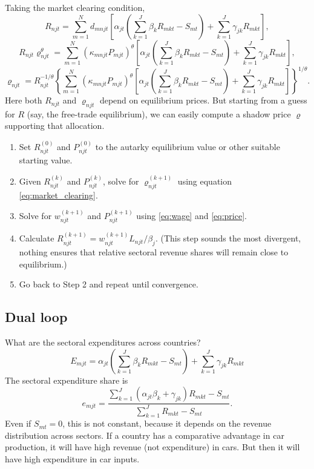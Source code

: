 \documentclass[12pt]{article}
\begin{document}
Taking the market clearing condition,
\begin{equation}
	R_{njt} = \sum_{m=1}^N
		d_{mnjt}
		\left[
			\alpha_{jt}
			\left(
				\sum_{k=1}^J\beta_k R_{mkt} - S_{mt}
			\right)
			+ \sum_{k=1}^J\gamma_{jk}R_{mkt}
		\right],
\end{equation}
\[
	R_{njt}\varrho_{njt}^{\theta} = \sum_{m=1}^N
		(\kappa_{mnjt} P_{mjt})^{\theta}
		\left[
			\alpha_{jt}
			\left(
				\sum_{k=1}^J\beta_k R_{mkt} - S_{mt}
			\right)
			+ \sum_{k=1}^J\gamma_{jk}R_{mkt}
		\right],
\]
\begin{equation}\label{eq:market_clearing}
	\varrho_{njt} = R_{njt}^{-1/\theta}
	\left\{
	\sum_{m=1}^N
		(\kappa_{mnjt} P_{mjt})^{\theta}
		\left[
			\alpha_{jt}
			\left(
				\sum_{k=1}^J\beta_k R_{mkt} - S_{mt}
			\right)
			+ \sum_{k=1}^J\gamma_{jk}R_{mkt}
		\right]
	\right\}^{1/\theta}.
\end{equation}
Here both $R_{njt}$ and $\varrho_{njt}$ depend on equilibrium prices. But starting from a guess for $R$ (say, the free-trade equilibrium), we can easily compute a shadow price $\varrho$ supporting that allocation. 
\begin{enumerate}
	\item Set $R_{njt}^{(0)}$ and $P_{njt}^{(0)}$ to the autarky equilibrium value or other suitable starting value.
	\item Given $R_{njt}^{(k)}$ and $P_{njt}^{(k)}$, solve for $\varrho_{njt}^{(k+1)}$ using equation \eqref{eq:market_clearing}.
	\item Solve for $w_{njt}^{(k+1)}$ and $P_{njt}^{(k+1)}$ using \eqref{eq:wage} and \eqref{eq:price}.
	\item Calculate $R_{njt}^{(k+1)} = w_{njt}^{(k+1)}L_{njt}/\beta_j$. (This step sounds the most divergent, nothing ensures that relative sectoral revenue shares will remain close to equilibrium.)
	\item Go back to Step 2 and repeat until convergence.
\end{enumerate}

\subsection{Dual loop}
What are the sectoral expenditures across countries?
\[
E_{mjt} = 			\alpha_{jt}
			\left(
				\sum_{k=1}^J\beta_k R_{mkt} - S_{mt}
			\right)
			+ \sum_{k=1}^J\gamma_{jk}R_{mkt}
\]
The sectoral expenditure share is
\begin{equation}\label{eq:sectoral_share}
e_{mjt} = \frac
	{\sum_{k=1}^J(\alpha_{jt}\beta_k+\gamma_{jk}) R_{mkt} - S_{mt}}
	{\sum_{k=1}^J R_{mkt}-S_{mt}}.
\end{equation}
Even if $S_{mt}=0$, this is not constant, because it depends on the revenue distribution across sectors. If a country has a comparative advantage in car production, it will have high revenue (not expenditure) in cars. But then it will have high expenditure in car inputs. 
\end{document}
